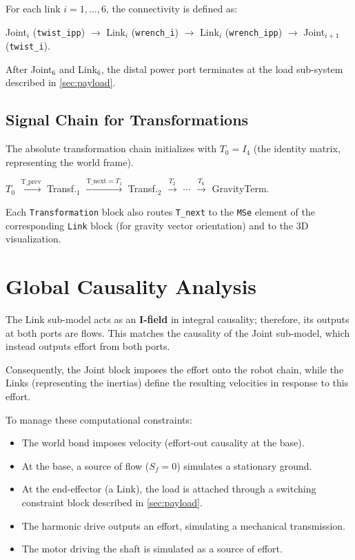 For each link $i = 1,\ldots,6$, the connectivity is defined as:
\begin{center}
  Joint$_i$ (\texttt{twist\_ipp}) $\longrightarrow$ Link$_i$ (\texttt{wrench\_i})
  $\longrightarrow$ Link$_i$ (\texttt{wrench\_ipp}) $\longrightarrow$ Joint$_{i+1}$ (\texttt{twist\_i}).
\end{center}
After Joint$_6$ and Link$_6$, the distal power port terminates at the load sub-system described in \cref{sec:payload}.

\subsection{Signal Chain for Transformations}

The absolute transformation chain initializes with $T_0 = I_4$ (the identity matrix, representing the world frame).
\begin{center}
  $T_0$ $\xrightarrow{\text{T\_prev}}$ Transf.$_1$ $\xrightarrow{\text{T\_next}=T_1}$ Transf.$_2$ $\xrightarrow{T_2}$ $\cdots$ $\xrightarrow{T_6}$ GravityTerm.
\end{center}
Each \texttt{Transformation} block also routes \texttt{T\_next} to the \texttt{MSe} element of the corresponding \texttt{Link} block (for gravity vector orientation) and to the 3D visualization.


\section{Global Causality Analysis}

The Link sub-model acts as an \textbf{I-field} in integral causality; therefore, its outputs at both ports are flows. This matches the causality of the Joint sub-model, which instead outputs effort from both ports. 

Consequently, the Joint block imposes the effort onto the robot chain, while the Links (representing the inertias) define the resulting velocities in response to this effort. 

To manage these computational constraints: 
\begin{itemize}
  \item The world bond imposes velocity (effort-out causality at the base).
  \item At the base, a source of flow ($S_f = 0$) simulates a stationary ground.
  \item At the end-effector (a Link), the load is attached through a switching constraint block described in \cref{sec:payload}.
  \item The harmonic drive outputs an effort, simulating a mechanical transmission. 
  \item The motor driving the shaft is simulated as a source of effort.
\end{itemize}

